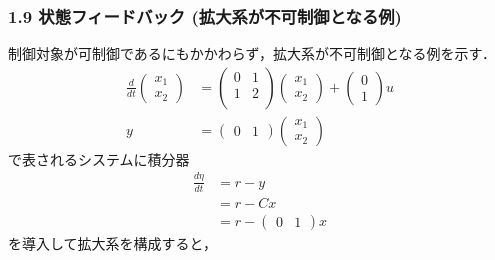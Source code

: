\documentclass[10pt]{beamer}
\begin{document}
\begin{frame}[t]
\frametitle{1.9 状態フィードバック (拡大系が不可制御となる例)}
制御対象が可制御であるにもかかわらず，拡大系が不可制御となる例を示す．
\begin{align}
 \frac{d}{dt}
 \left(
 \begin{array}{c}
  x_1 \\
  x_2
 \end{array}
 \right) &=
 \left(
 \begin{array}{cc}
  0 & 1 \\
  1 & 2 \\
 \end{array}
 \right)
 \left(
 \begin{array}{c}
  x_1 \\
  x_2
 \end{array}
 \right) +
 \left(
 \begin{array}{c}
  0 \\
  1
 \end{array}
 \right) u \\
 y &=
 \left(
 \begin{array}{cc}
  0 & 1
 \end{array}
 \right)
 \left(
 \begin{array}{c}
  x_1 \\
  x_2
 \end{array}
 \right)
\end{align}
で表されるシステムに積分器
\begin{align}
 \frac{d\eta}{dt} &= r - y \\
 &= r - Cx \\
 &= r - \left(\begin{array}{cc}0 & 1\end{array}\right)x
\end{align}
を導入して拡大系を構成すると，
\end{frame}
\end{document}

